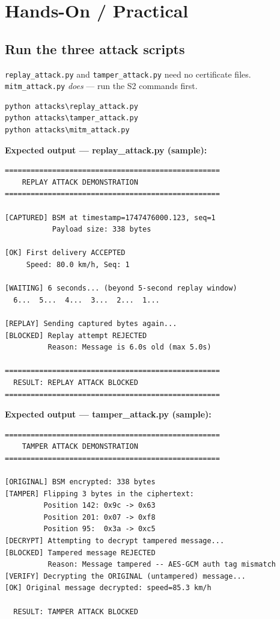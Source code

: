 \documentclass[11pt,a4paper]{report}
\begin{document}
\section{Hands-On / Practical}

\subsection{Run the three attack scripts}
\texttt{replay\_attack.py} and \texttt{tamper\_attack.py} need no certificate
files. \texttt{mitm\_attack.py} \emph{does} --- run the S2 commands first.
\begin{lstlisting}[style=term]
python attacks\replay_attack.py
python attacks\tamper_attack.py
python attacks\mitm_attack.py
\end{lstlisting}

\noindent\textbf{Expected output --- replay\_attack.py (sample):}
\begin{lstlisting}[style=term]
==================================================
    REPLAY ATTACK DEMONSTRATION
==================================================

[CAPTURED] BSM at timestamp=1747476000.123, seq=1
           Payload size: 338 bytes

[OK] First delivery ACCEPTED
     Speed: 80.0 km/h, Seq: 1

[WAITING] 6 seconds... (beyond 5-second replay window)
  6...  5...  4...  3...  2...  1...

[REPLAY] Sending captured bytes again...
[BLOCKED] Replay attempt REJECTED
          Reason: Message is 6.0s old (max 5.0s)

==================================================
  RESULT: REPLAY ATTACK BLOCKED
==================================================
\end{lstlisting}

\noindent\textbf{Expected output --- tamper\_attack.py (sample):}
\begin{lstlisting}[style=term]
==================================================
    TAMPER ATTACK DEMONSTRATION
==================================================

[ORIGINAL] BSM encrypted: 338 bytes
[TAMPER] Flipping 3 bytes in the ciphertext:
         Position 142: 0x9c -> 0x63
         Position 201: 0x07 -> 0xf8
         Position 95:  0x3a -> 0xc5
[DECRYPT] Attempting to decrypt tampered message...
[BLOCKED] Tampered message REJECTED
          Reason: Message tampered -- AES-GCM auth tag mismatch
[VERIFY] Decrypting the ORIGINAL (untampered) message...
[OK] Original message decrypted: speed=85.3 km/h

  RESULT: TAMPER ATTACK BLOCKED
\end{lstlisting}
\end{document}
